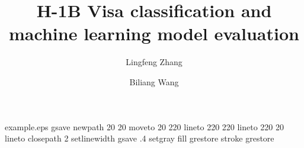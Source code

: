 %
%
%
%
%
\begin{filecontents*}{example.eps}
gsave
newpath
  20 20 moveto
  20 220 lineto
  220 220 lineto
  220 20 lineto
closepath
2 setlinewidth
gsave
  .4 setgray fill
grestore
stroke
grestore
\end{filecontents*}
%
\RequirePackage{fix-cm}
%
\documentclass{svjour3}                     %
%
\smartqed  %
%
\usepackage{graphicx}
\usepackage{grffile}
\usepackage{bbding}
\usepackage[numbers,sort&compress]{natbib}
\usepackage{tabularx}
\usepackage[toc,page]{appendix}
%
%
%
%
%



\title{H-1B Visa classification and machine learning model evaluation%
}


\author{Lingfeng Zhang        \and
        Biliang Wang %
}


